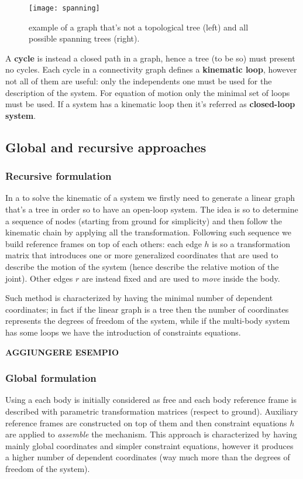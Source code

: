 	\begin{SCfigure}[2][bht]
		\centering \texttt{[image: spanning]}
		\caption{example of a graph that's not a topological tree (left) and all possible spanning trees (right).}
		\label{fig:mb:spanningtree}
	\end{SCfigure}

	A \textbf{cycle} is instead a closed path in a graph, hence a tree (to be so) must present no cycles. Each cycle in a connectivity graph defines a \textbf{kinematic loop}, however not all of them are useful: only the independents one must be used for the description of the system. For equation of motion only the minimal set of loops must be used. If a system has a kinematic loop then it's referred as \textbf{closed-loop system}.
	
\subsection{Global and recursive approaches}
	\subsubsection{Recursive formulation}
		In a  to solve the kinematic of a system we firstly need to generate a linear graph that's a tree in order so to have an open-loop system. The idea is so to determine a sequence of nodes (starting from ground for simplicity) and then follow the kinematic chain by applying all the transformation. Following such sequence we build reference frames on top of each others: each edge $h$ is so a transformation matrix that introduces one or more generalized coordinates that are used to describe the motion of the system  (hence describe the relative motion of the joint). Other edges $r$ are instead fixed and are used to \textit{move} inside the body.
		
		Such method is characterized by having the minimal number of dependent coordinates; in fact if the linear graph is a tree then the number of coordinates represents the degrees of freedom of the system, while if the multi-body system has some loops we have the introduction of constraints equations.
		
		\textbf{AGGIUNGERE ESEMPIO}
		
	\subsubsection{Global formulation}
		Using a  each body is initially considered as free and each body reference frame is described with parametric transformation matrices (respect to ground). Auxiliary reference frames are constructed on top of them and then constraint equations $h$ are applied to \textit{assemble} the mechanism. This approach is characterized by having mainly global coordinates and simpler constraint equations, however it produces a higher number of dependent coordinates (way much more than the degrees of freedom of the system).
		
